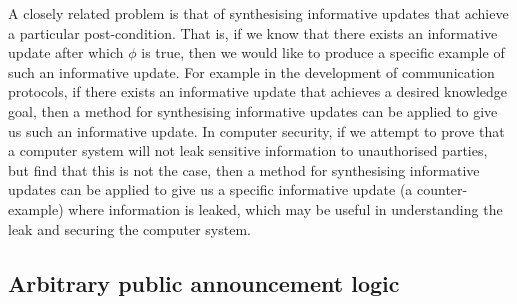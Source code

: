A closely related problem is that of synthesising
informative updates that achieve a particular post-condition. That is, if we
know that there exists an informative update after which $\phi$ is true, then we
would like to produce a specific example of such an informative update. For
example in the development of communication protocols, if there exists an
informative update that achieves a desired knowledge goal, then a method for
synthesising informative updates can be applied to give us such an informative
update. In computer security, if we attempt to prove that a computer system will
not leak sensitive information to unauthorised parties, but find that this is
not the case, then a method for synthesising informative updates can be applied
to give us a specific informative update (a counter-example) where information
is leaked, which may be useful in understanding the leak and securing the
computer system.

\subsection{Arbitrary public announcement logic}

